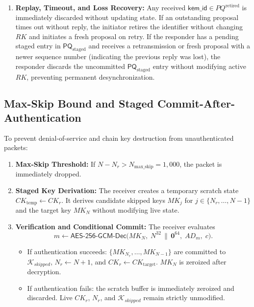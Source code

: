 \documentclass[11pt,a4paper]{article}
\theoremstyle{remark}
\theoremstyle{plain}
\begin{document}
\begin{enumerate}
\begin{itemize}
    \end{itemize}
  \item \textbf{Replay, Timeout, and Loss Recovery:} Any received $\mathsf{kem\_id} \in PQ^{\mathrm{retired}}$ is immediately discarded without updating state. If an outstanding proposal times out without reply, the initiator retires the identifier without changing $RK$ and initiates a fresh proposal on retry. If the responder has a pending staged entry in $\mathsf{PQ}_{\mathrm{staged}}$ and receives a retransmission or fresh proposal with a newer sequence number (indicating the previous reply was lost), the responder discards the uncommitted $\mathsf{PQ}_{\mathrm{staged}}$ entry without modifying active $RK$, preventing permanent desynchronization.
\end{enumerate}

\subsection{Max-Skip Bound and Staged Commit-After-Authentication}
To prevent denial-of-service and chain key destruction from unauthenticated packets:
\begin{enumerate}
  \item \textbf{Max-Skip Threshold:} If $N - N_r > N_{\mathrm{max\_skip}} = 1{,}000$, the packet is immediately dropped.
  \item \textbf{Staged Key Derivation:} The receiver creates a temporary scratch state $CK_{\mathrm{temp}} \leftarrow CK_r$. It derives candidate skipped keys $MK_j$ for $j \in \{N_r, \dots, N-1\}$ and the target key $MK_N$ without modifying live state.
  \item \textbf{Verification and Conditional Commit:} The receiver evaluates
    \[
      m \gets \mathsf{AES\text{-}256\text{-}GCM}\text{-}\mathsf{Dec}\bigl(MK_N,\; N^{32} \,\|\, \mathbf{0}^{64},\; AD_m,\; c\bigr).
    \]
    \begin{itemize}
      \item If authentication succeeds: $\{MK_{N_r}, \dots, MK_{N-1}\}$ are committed to $\mathcal{K}_{skipped}$, $N_r \leftarrow N + 1$, and $CK_r \leftarrow CK_{\mathrm{target}}$. $MK_N$ is zeroized after decryption.
      \item If authentication fails: the scratch buffer is immediately zeroized and discarded. Live $CK_r$, $N_r$, and $\mathcal{K}_{skipped}$ remain strictly unmodified.
    \end{itemize}
\end{enumerate}
\end{document}
